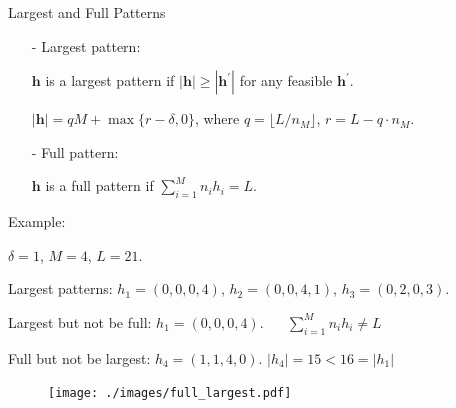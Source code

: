   \begin{frame}{Largest and Full Patterns}
    \begin{itemize} 
      \item[-] {\color{red}Largest} pattern: 
      
      $\bm{h}$ is a largest pattern if $|\bm{h}| \geq |\bm{h}^{\prime}|$ for any feasible $\bm{h}^{\prime}$.
      
      $|\bm{h}| = qM + \max\{r-\delta, 0\}$, where $q = \lfloor L/n_M \rfloor$, $r = L - q \cdot n_M$.
      
      \item[-] {\color{red}Full} pattern: 
      
      $\bm{h}$ is a full pattern if $\sum_{i=1}^{M} n_i h_i = L$.  
    \end{itemize}

     {\color{green} Example}: 
      
      $\delta = 1$, $M =4$, $L = 21$.
      
      Largest patterns: $h_1 = (0, 0, 0, 4)$, $h_2 = (0, 0, 4, 1)$, $h_3 = (0, 2, 0, 3)$.

      Largest but not be full: $h_1 = (0, 0, 0, 4)$. {\color{red} $\quad$ $\sum_{i=1}^{M} n_i h_i \neq L$}

      Full but not be largest: $h_4 = (1, 1, 4, 0)$. {\color{red} $|h_4| = 15 < 16 = |h_1|$}

      \begin{figure}[ht]
        \centering
        \texttt{[image: ./images/full\_largest.pdf]}
      \end{figure}
  \end{frame}




  


